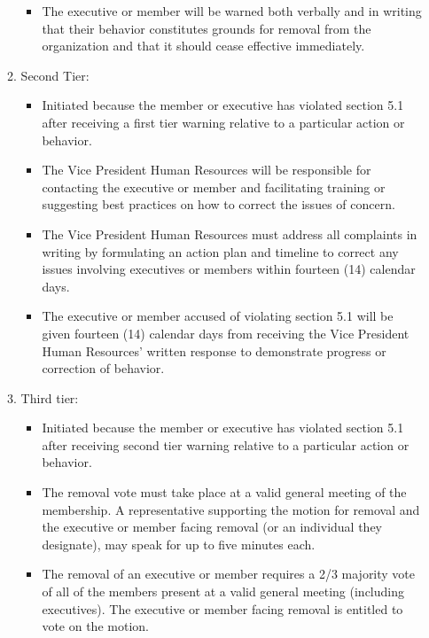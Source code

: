 \documentclass[12pt]{article}
\begin{document}
\begin{enumerate}[{5}.1]
\begin{enumerate}[{5.3}.1]
        \begin{itemize}
            \item The executive or member will be warned both verbally and in writing that their behavior constitutes grounds for removal from the organization and that it should cease effective immediately. 
        \end{itemize}
        \item	Second Tier: 
        \begin{itemize}
            \item	Initiated because the member or executive has violated section 5.1 after receiving a first tier warning relative to a particular action or behavior.
            \item	The Vice President Human Resources will be responsible for contacting the executive or member and facilitating training or suggesting best practices on how to correct the issues of concern. 
            \item	The Vice President Human Resources must address all complaints in writing by formulating an action plan and timeline to correct any issues involving executives or members within fourteen (14) calendar days. 
            \item	The executive or member accused of violating section 5.1 will be given fourteen (14) calendar days from receiving the Vice President Human Resources’ written response to demonstrate progress or correction of behavior. 
        \end{itemize}
        \item Third tier:
        \begin{itemize}
            \item	Initiated because the member or executive has violated section 5.1 after receiving second tier warning relative to a particular action or behavior.  
            \item	The removal vote must take place at a valid general meeting of the membership.  A representative supporting the motion for removal and the executive or member facing removal (or an individual they designate), may speak for up to five minutes each.
            \item	The removal of an executive or member requires a 2/3 majority vote of all of the members present at a valid general meeting (including executives).  The executive or member facing removal is entitled to vote on the motion. 
        \end{itemize}
    \end{enumerate}
\end{enumerate}
\end{document}
